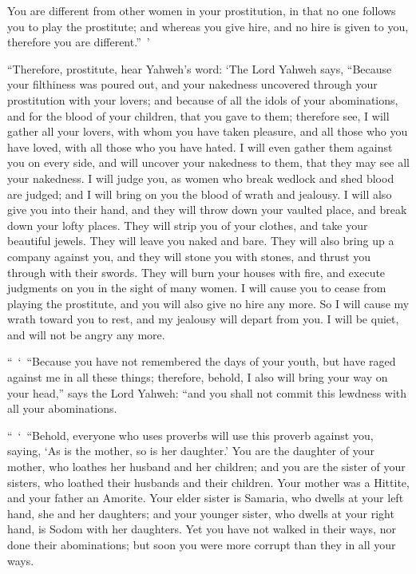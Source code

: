 {You are different from other women in your prostitution, in that no one follows you to play the prostitute; and whereas you give hire, and no hire is given to you, therefore you are different.” ’
\par }{\PP {}“Therefore, prostitute, hear Yahweh’s word:
‘The Lord Yahweh says, “Because your filthiness was poured out, and your nakedness uncovered through your prostitution with your lovers; and because of all the idols of your abominations, and for the blood of your children, that you gave to them;
therefore see, I will gather all your lovers, with whom you have taken pleasure, and all those who you have loved, with all those who you have hated. I will even gather them against you on every side, and will uncover your nakedness to them, that they may see all your nakedness.
I will judge you, as women who break wedlock and shed blood are judged; and I will bring on you the blood of wrath and jealousy.
I will also give you into their hand, and they will throw down your vaulted place, and break down your lofty places. They will strip you of your clothes, and take your beautiful jewels. They will leave you naked and bare.
They will also bring up a company against you, and they will stone you with stones, and thrust you through with their swords.
They will burn your houses with fire, and execute judgments on you in the sight of many women. I will cause you to cease from playing the prostitute, and you will also give no hire any more.
So I will cause my wrath toward you to rest, and my jealousy will depart from you. I will be quiet, and will not be angry any more.
\par }{\PP {}“ ‘ “Because you have not remembered the days of your youth, but have raged against me in all these things; therefore, behold, I also will bring your way on your head,” says the Lord Yahweh: “and you shall not commit this lewdness with all your abominations.
\par }{\PP {}“ ‘ “Behold, everyone who uses proverbs will use this proverb against you, saying, ‘As is the mother, so is her daughter.’
You are the daughter of your mother, who loathes her husband and her children; and you are the sister of your sisters, who loathed their husbands and their children. Your mother was a Hittite, and your father an Amorite.
Your elder sister is Samaria, who dwells at your left hand, she and her daughters; and your younger sister, who dwells at your right hand, is Sodom with her daughters.
Yet you have not walked in their ways, nor done their abominations; but soon you were more corrupt than they in all your ways.
}
